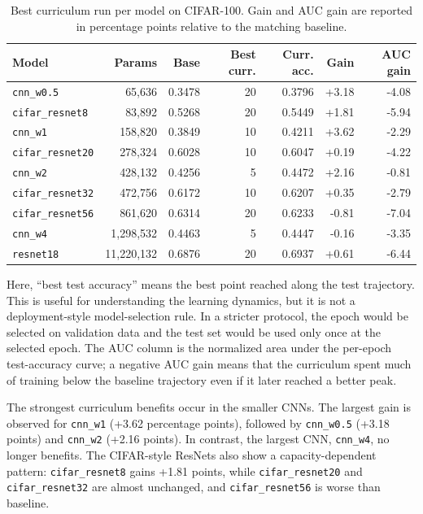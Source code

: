 \begin{table}[h]
\centering
\small
\begin{tabular}{lrrrrrr}
\hline
Model & Params & Base & Best curr. & Curr. acc. & Gain & AUC gain \\
\hline
\texttt{cnn\_w0.5} & 65,636 & 0.3478 & 20 & 0.3796 & +3.18 & -4.08 \\
\texttt{cifar\_resnet8} & 83,892 & 0.5268 & 20 & 0.5449 & +1.81 & -5.94 \\
\texttt{cnn\_w1} & 158,820 & 0.3849 & 10 & 0.4211 & +3.62 & -2.29 \\
\texttt{cifar\_resnet20} & 278,324 & 0.6028 & 10 & 0.6047 & +0.19 & -4.22 \\
\texttt{cnn\_w2} & 428,132 & 0.4256 & 5 & 0.4472 & +2.16 & -0.81 \\
\texttt{cifar\_resnet32} & 472,756 & 0.6172 & 10 & 0.6207 & +0.35 & -2.79 \\
\texttt{cifar\_resnet56} & 861,620 & 0.6314 & 20 & 0.6233 & -0.81 & -7.04 \\
\texttt{cnn\_w4} & 1,298,532 & 0.4463 & 5 & 0.4447 & -0.16 & -3.35 \\
\texttt{resnet18} & 11,220,132 & 0.6876 & 20 & 0.6937 & +0.61 & -6.44 \\
\hline
\end{tabular}
\caption{Best curriculum run per model on CIFAR-100. Gain and AUC gain are
reported in percentage points relative to the matching baseline.}
\label{tab:cifar100-model-size-best}
\end{table}

Here, ``best test accuracy'' means the best point reached along the test
trajectory. This is useful for understanding the learning dynamics, but it is
not a deployment-style model-selection rule. In a stricter protocol, the epoch
would be selected on validation data and the test set would be used only once at
the selected epoch. The AUC column is the normalized area under the per-epoch
test-accuracy curve; a negative AUC gain means that the curriculum spent much of
training below the baseline trajectory even if it later reached a better peak.

The strongest curriculum benefits occur in the smaller CNNs. The largest gain is
observed for \texttt{cnn\_w1} (+3.62 percentage points), followed by
\texttt{cnn\_w0.5} (+3.18 points) and \texttt{cnn\_w2} (+2.16 points). In
contrast, the largest CNN, \texttt{cnn\_w4}, no longer benefits. The CIFAR-style
ResNets also show a capacity-dependent pattern: \texttt{cifar\_resnet8} gains
+1.81 points, while \texttt{cifar\_resnet20} and \texttt{cifar\_resnet32} are
almost unchanged, and \texttt{cifar\_resnet56} is worse than baseline.

